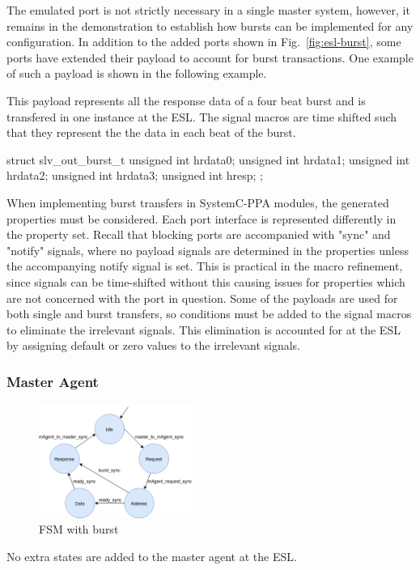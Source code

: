 The emulated port is not strictly necessary in a single master system, however, it remains in the demonstration to establish how bursts can be implemented for any configuration. In addition to the added ports shown in Fig.~\ref{fig:esl-burst}, some ports have extended their payload to account for burst transactions. One example of such a payload is shown in the following example. \par 
This payload represents all the response data of a four beat burst and is transfered in one instance at the ESL. The signal macros are time shifted such that they represent the the data in each beat of the burst. 
\begin{C++}
struct slv_out_burst_t{
    unsigned int hrdata0;
    unsigned int hrdata1;
    unsigned int hrdata2;
    unsigned int hrdata3;
    unsigned int hresp;
};
\end{C++}

When implementing burst transfers in SystemC-PPA modules, the generated properties must be considered. Each port interface is represented differently in the property set. Recall that blocking ports are accompanied with "sync" and "notify" signals, where no payload signals are determined in the properties unless the accompanying notify signal is set. This is practical in the macro refinement, since signals can be time-shifted without this causing issues for properties which are not concerned with the port in question. Some of the payloads are used for both single and burst transfers, so conditions must be added to the signal macros to eliminate the irrelevant signals. This elimination is accounted for at the ESL by assigning default or zero values to the irrelevant signals.  
     

\subsubsection{Master Agent}
\begin{figure}
\includegraphics[width=5cm]{figs/ESL/mAgent_burstesl.png}
\caption{FSM with burst}\label{fig:magt-burstesl}
\end{figure} 

No extra states are added to the master agent at the ESL.







